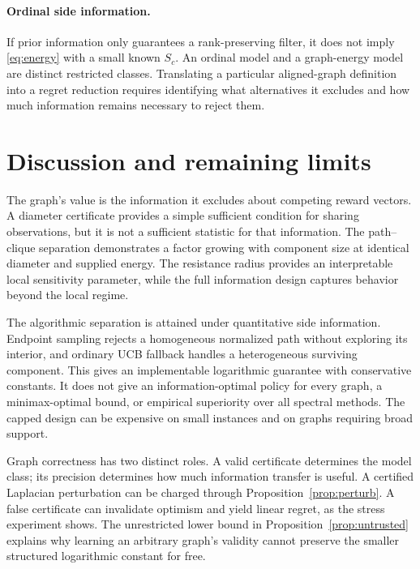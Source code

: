 \documentclass[11pt]{article}
\begin{document}
\paragraph{Ordinal side information.}
If prior information only guarantees a rank-preserving filter, it does not imply \eqref{eq:energy} with a small known $S_c$. An ordinal model and a graph-energy model are distinct restricted classes. Translating a particular aligned-graph definition into a regret reduction requires identifying what alternatives it excludes and how much information remains necessary to reject them.



\section{Discussion and remaining limits}
The graph's value is the information it excludes about competing reward vectors. A diameter certificate provides a simple sufficient condition for sharing observations, but it is not a sufficient statistic for that information. The path--clique separation demonstrates a factor growing with component size at identical diameter and supplied energy. The resistance radius provides an interpretable local sensitivity parameter, while the full information design captures behavior beyond the local regime.

The algorithmic separation is attained under quantitative side information. Endpoint sampling rejects a homogeneous normalized path without exploring its interior, and ordinary UCB fallback handles a heterogeneous surviving component. This gives an implementable logarithmic guarantee with conservative constants. It does not give an information-optimal policy for every graph, a minimax-optimal bound, or empirical superiority over all spectral methods. The capped design can be expensive on small instances and on graphs requiring broad support.

Graph correctness has two distinct roles. A valid certificate determines the model class; its precision determines how much information transfer is useful. A certified Laplacian perturbation can be charged through Proposition~\ref{prop:perturb}. A false certificate can invalidate optimism and yield linear regret, as the stress experiment shows. The unrestricted lower bound in Proposition~\ref{prop:untrusted} explains why learning an arbitrary graph's validity cannot preserve the smaller structured logarithmic constant for free.
\end{document}

